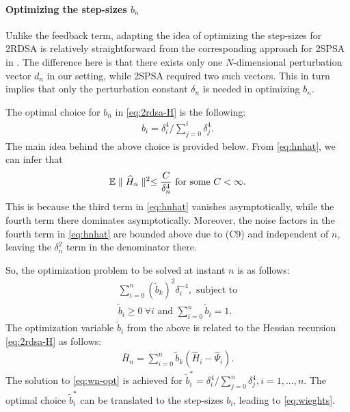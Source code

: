 \documentclass[letterpaper, 10 pt, conference]{ieeeconf}  %
\begin{document}
\paragraph{\textbf{Optimizing the step-sizes }$b_n$}
Unlike the feedback term, adapting the idea of optimizing the step-sizes for 2RDSA is relatively straightforward from the corresponding approach for 2SPSA in \cite{spall-jacobian}. The difference here is that there exists only one $N$-dimensional perturbation vector $d_n$ in our setting, while 2SPSA required two such vectors. This in turn implies that only the perturbation constant $\delta_n$ is needed in optimizing $b_n$.

The optimal choice for $b_n$ in \eqref{eq:2rdsa-H} is the following:
\begin{align}
\label{eq:wieghts}
b_i  = \delta_i^{4}/\sum\limits_{j=0}^{i} \delta_j^{4}.
\end{align}
The main idea behind the above choice is provided below.
From \eqref{eq:hnhat}, we can infer that
\begin{align*}
\mathbb{E} \parallel \widehat H_n \parallel^2 \le \dfrac{C}{\delta_n^4} \text{ for some } C<\infty. 
\end{align*} 
This is because the third term in \eqref{eq:hnhat} vanishes asymptotically, while the fourth term there dominates asymptotically. Moreover, the noise factors in the fourth term in \eqref{eq:hnhat} are bounded above due to (C9) and independent of $n$, leaving the $\delta_n^2$ term in the denominator there. 

So, the optimization problem to be solved at instant $n$ is as follows:
\begin{align}
\sum \limits_{i=0}^{n} (\tilde b_k)^2 \delta_i^{-4}, \text{ subject to} \label{eq:wn-opt}\\
\tilde b_i \geq 0 ~\forall i \text{ and }\sum \limits_{i=0}^{n} \tilde b_i = 1.
\end{align}
The optimization variable $\tilde b_i$ from the above is related to the Hessian recursion \eqref{eq:2rdsa-H} as follows:
\begin{align}
\label{eq:hess}
\overline H_n = \sum\limits_{i=0}^{n} \tilde b_k(\widehat H_i -\widehat \Psi_i).
\end{align}
The solution to \eqref{eq:wn-opt} is achieved for $\tilde b_i^* = \delta_i^{4}/\sum \limits_{j=0}^{n} \delta_j^{4}, i=1,\ldots,n$. The optimal choice $\tilde b_i^*$ can be translated to the step-sizes $b_i$, leading to \eqref{eq:wieghts}.
\end{document}
